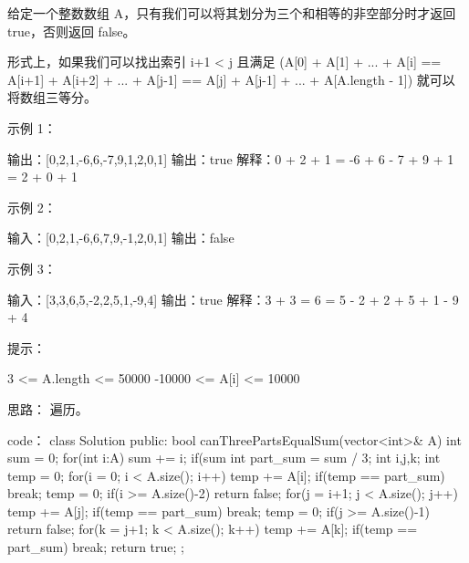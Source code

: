 给定一个整数数组 A，只有我们可以将其划分为三个和相等的非空部分时才返回 true，否则返回 false。

形式上，如果我们可以找出索引 i+1 < j 且满足 (A[0] + A[1] + ... + A[i] == A[i+1] + A[i+2] + ... + A[j-1] == A[j] + A[j-1] + ... + A[A.length - 1]) 就可以将数组三等分。

 

示例 1：

输出：[0,2,1,-6,6,-7,9,1,2,0,1]
输出：true
解释：0 + 2 + 1 = -6 + 6 - 7 + 9 + 1 = 2 + 0 + 1

示例 2：

输入：[0,2,1,-6,6,7,9,-1,2,0,1]
输出：false

示例 3：

输入：[3,3,6,5,-2,2,5,1,-9,4]
输出：true
解释：3 + 3 = 6 = 5 - 2 + 2 + 5 + 1 - 9 + 4

 

提示：

    3 <= A.length <= 50000
    -10000 <= A[i] <= 10000

































思路：
遍历。





























code：
class Solution {
public:
    bool canThreePartsEqualSum(vector<int>& A) {
        int sum = 0;
        for(int i:A)
            sum += i;
        if(sum %
        int part_sum = sum / 3;
        int i,j,k;
        int temp = 0;
        for(i = 0; i < A.size(); i++)
        {
            temp += A[i];
            if(temp == part_sum)
                break;
        }
        temp = 0;
        if(i >= A.size()-2) return false;
        for(j = i+1; j < A.size(); j++)
        {
            temp += A[j];
            if(temp == part_sum)
                break;
        }
        temp = 0;
        if(j >= A.size()-1) return false;
        for(k = j+1; k < A.size(); k++)
        {
            temp += A[k];
            if(temp == part_sum)
                break;
        }
        return true;
    }
};